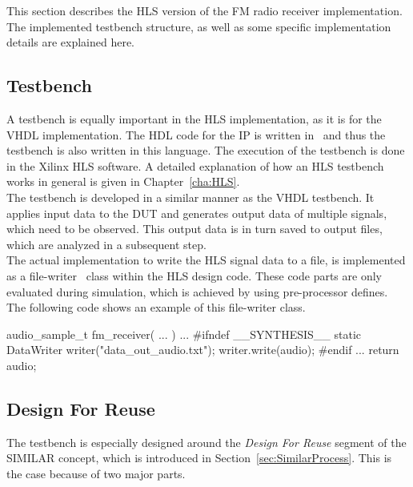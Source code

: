 This section describes the HLS version of the FM radio receiver implementation.
The implemented testbench structure, as well as some specific implementation details are explained here.

\subsection{Testbench}
\label{sec:impl:hls:testbench}

A testbench is equally important in the HLS implementation, as it is for the VHDL implementation.
The HDL code for the IP is written in \cplusplus\ and thus the testbench is also written in this language.
The execution of the testbench is done in the Xilinx HLS software.
A detailed explanation of how an HLS testbench works in general is given in Chapter~\ref{cha:HLS}.\\

The testbench is developed in a similar manner as the VHDL testbench.
It applies input data to the DUT and generates output data of multiple signals, which need to be observed.
This output data is in turn saved to output files, which are analyzed in a subsequent step.\\

The actual implementation to write the HLS signal data to a file, is implemented as a file-writer \cplusplus\ class within the HLS design code.
These code parts are only evaluated during simulation, which is achieved by using pre-processor defines.
The following code shows an example of this file-writer class.\\

\begin{CppCode}
audio_sample_t fm_receiver( ... ) {
  ...
#ifndef __SYNTHESIS__
  static DataWriter writer("data_out_audio.txt");
  writer.write(audio);
#endif
  ...
  return audio;
}
\end{CppCode}


\subsection{Design For Reuse}

The testbench is especially designed around the \textit{Design For Reuse} segment of the SIMILAR concept, which is introduced in Section~\ref{sec:SimilarProcess}.
This is the case because of two major parts.

